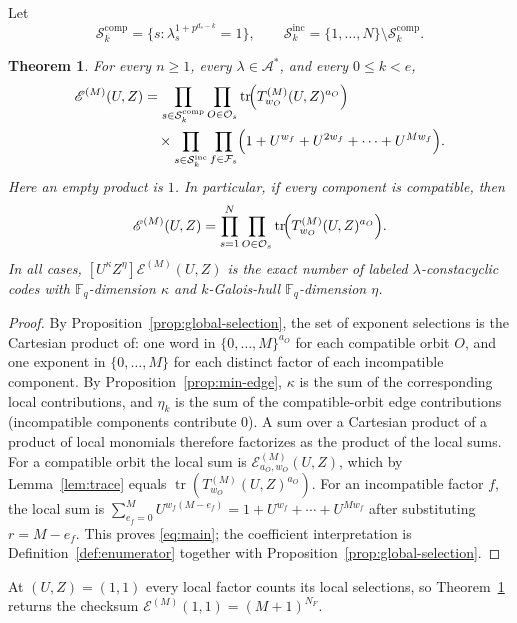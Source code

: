 \documentclass[preprint,12pt,a4paper]{elsarticle}
\newcommand{\F}{\mathbb F}
\newcommand{\A}{\mathcal A}
\newcommand{\Fs}{\mathcal F_s}
\newcommand{\Os}{\mathcal O_s}
\newcommand{\Epoly}{\mathscr E}
\newtheorem{theorem}{Theorem}
\theoremstyle{definition}
\theoremstyle{remark}
\begin{document}
Let
{\small
\[
\mathcal{S}_k^{\mathrm{comp}}
 =\{s:\lambda_s^{1+p^{d_s-k}}=1\},
\qquad
\mathcal{S}_k^{\mathrm{inc}}=\{1,\ldots,N\}\setminus
                               \mathcal{S}_k^{\mathrm{comp}} .
\]
}
\begin{theorem}\label{thm:main}
For every $n\geq1$, every $\lambda\in\A^\ast$, and every $0\leq k<e$,
{\small
\begin{align}
\Epoly^{(M)}(U,Z)
&=\prod_{s\in\mathcal{S}_k^{\mathrm{comp}}}
  \prod_{O\in\Os}
  \operatorname{tr}\!\Bigl(
  T^{(M)}_{w_O}(U,Z)^{a_O}
  \Bigr)\notag\\
&\quad\times
  \prod_{s\in\mathcal{S}_k^{\mathrm{inc}}}
  \prod_{f\in\Fs}
  \Bigl(1+U^{w_f}+U^{2w_f}
  +\cdots+U^{Mw_f}\Bigr).
\label{eq:main}
\end{align}
}
Here an empty product is $1$.  In particular, if every component is
compatible, then
\[
\Epoly^{(M)}(U,Z)
 =\prod_{s=1}^{N}\prod_{O\in\Os}
   \operatorname{tr}\!\Bigl(T^{(M)}_{w_O}(U,Z)^{a_O}\Bigr).
\]
In all cases, $[U^\kappa Z^\eta]\Epoly^{(M)}(U,Z)$ is the exact number of labeled
$\lambda$-constacyclic codes with $\F_q$-dimension $\kappa$ and
$k$-Galois-hull $\F_q$-dimension $\eta$.
\end{theorem}

\begin{proof}
By Proposition~\ref{prop:global-selection}, the set of exponent selections is
the Cartesian product of: one word in $\{0,\ldots,M\}^{a_O}$ for each
compatible orbit $O$, and one exponent in $\{0,\ldots,M\}$ for each distinct
factor of each incompatible component.  By
Proposition~\ref{prop:min-edge}, $\kappa$ is the sum of the corresponding
local contributions, and $\eta_k$ is the sum of the compatible-orbit edge
contributions (incompatible components contribute $0$).  A sum over a Cartesian
product of a product of local monomials therefore factorizes as the product of
the local sums.  For a compatible orbit the local sum is
$\Epoly_{a_O,w_O}^{(M)}(U,Z)$, which by Lemma~\ref{lem:trace} equals
$\operatorname{tr}(T^{(M)}_{w_O}(U,Z)^{a_O})$.  For an incompatible factor
$f$, the local sum is
$\sum_{e_f=0}^{M}U^{w_f(M-e_f)}
 =1+U^{w_f}+\cdots+U^{Mw_f}$ after substituting $r=M-e_f$.  This proves
\eqref{eq:main}; the coefficient interpretation is
Definition~\ref{def:enumerator} together with
Proposition~\ref{prop:global-selection}.
\end{proof}

At $(U,Z)=(1,1)$ every local factor counts its local selections, so
Theorem~\ref{thm:main} returns the checksum
$\Epoly^{(M)}(1,1)=(M+1)^{N_F}$.
\end{document}
